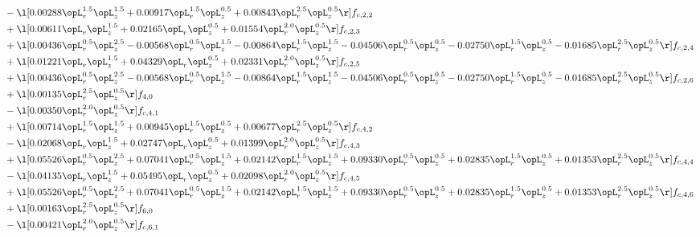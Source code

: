 \begin{alignat}{2}
& - \l[  0.00288 \opL_r^{1.5} \opL_z^{1.5} +  0.00917 \opL_r^{1.5} \opL_z^{0.5} +  0.00843 \opL_r^{2.5} \opL_z^{0.5}  \r] f_{c,2,2} \nonumber \\ 
& + \l[  0.00611 \opL_r \opL_z^{1.5} +  0.02165 \opL_r \opL_z^{0.5} +  0.01554 \opL_r^{2.0} \opL_z^{0.5}  \r] f_{c,2,3} \nonumber \\ 
& + \l[  0.00436 \opL_r^{0.5} \opL_z^{2.5}   -0.00568 \opL_r^{0.5} \opL_z^{1.5}   -0.00864 \opL_r^{1.5} \opL_z^{1.5}   -0.04506 \opL_r^{0.5} \opL_z^{0.5}   -0.02750 \opL_r^{1.5} \opL_z^{0.5}   -0.01685 \opL_r^{2.5} \opL_z^{0.5}  \r] f_{c,2,4} \nonumber \\ 
& + \l[  0.01221 \opL_r \opL_z^{1.5} +  0.04329 \opL_r \opL_z^{0.5} +  0.02331 \opL_r^{2.0} \opL_z^{0.5}  \r] f_{c,2,5} \nonumber \\ 
& + \l[  0.00436 \opL_r^{0.5} \opL_z^{2.5}   -0.00568 \opL_r^{0.5} \opL_z^{1.5}   -0.00864 \opL_r^{1.5} \opL_z^{1.5}   -0.04506 \opL_r^{0.5} \opL_z^{0.5}   -0.02750 \opL_r^{1.5} \opL_z^{0.5}   -0.01685 \opL_r^{2.5} \opL_z^{0.5}  \r] f_{c,2,6} \nonumber \\ 
& + \l[  0.00135 \opL_r^{2.5} \opL_z^{0.5}  \r] f_{4,0} \nonumber \\ 
& - \l[  0.00350 \opL_r^{2.0} \opL_z^{0.5}  \r] f_{c,4,1} \nonumber \\ 
& + \l[  0.00714 \opL_r^{1.5} \opL_z^{1.5} +  0.00945 \opL_r^{1.5} \opL_z^{0.5} +  0.00677 \opL_r^{2.5} \opL_z^{0.5}  \r] f_{c,4,2} \nonumber \\ 
& - \l[  0.02068 \opL_r \opL_z^{1.5} +  0.02747 \opL_r \opL_z^{0.5} +  0.01399 \opL_r^{2.0} \opL_z^{0.5}  \r] f_{c,4,3} \nonumber \\ 
& + \l[  0.05526 \opL_r^{0.5} \opL_z^{2.5} +  0.07041 \opL_r^{0.5} \opL_z^{1.5} +  0.02142 \opL_r^{1.5} \opL_z^{1.5} +  0.09330 \opL_r^{0.5} \opL_z^{0.5} +  0.02835 \opL_r^{1.5} \opL_z^{0.5} +  0.01353 \opL_r^{2.5} \opL_z^{0.5}  \r] f_{c,4,4} \nonumber \\ 
& - \l[  0.04135 \opL_r \opL_z^{1.5} +  0.05495 \opL_r \opL_z^{0.5} +  0.02098 \opL_r^{2.0} \opL_z^{0.5}  \r] f_{c,4,5} \nonumber \\ 
& + \l[  0.05526 \opL_r^{0.5} \opL_z^{2.5} +  0.07041 \opL_r^{0.5} \opL_z^{1.5} +  0.02142 \opL_r^{1.5} \opL_z^{1.5} +  0.09330 \opL_r^{0.5} \opL_z^{0.5} +  0.02835 \opL_r^{1.5} \opL_z^{0.5} +  0.01353 \opL_r^{2.5} \opL_z^{0.5}  \r] f_{c,4,6} \nonumber \\ 
& + \l[  0.00163 \opL_r^{2.5} \opL_z^{0.5}  \r] f_{6,0} \nonumber \\ 
& - \l[  0.00421 \opL_r^{2.0} \opL_z^{0.5}  \r] f_{c,6,1} \nonumber \\ 

\end{alignat}
